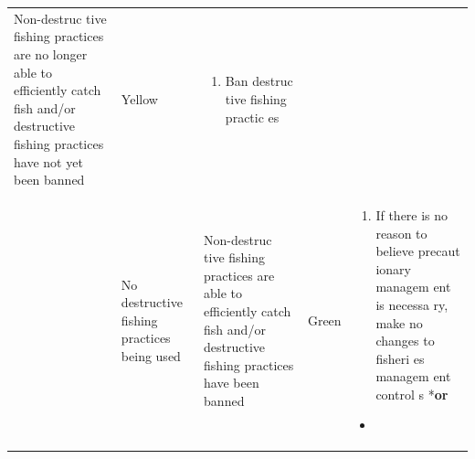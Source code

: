 \documentclass[]{book}
\providecommand{\tightlist}{%
  \setlength{\itemsep}{0pt}\setlength{\parskip}{0pt}}
\begin{document}
\begin{longtable}[]{@{}lllll@{}}
\begin{minipage}[t]{0.19\columnwidth}
Non-destruc tive fishing practices are no longer able to efficiently
catch fish and/or destructive fishing practices have not yet been
banned\strut
\end{minipage} & \begin{minipage}[t]{0.19\columnwidth}\raggedright\strut
Yellow\strut
\end{minipage} & \begin{minipage}[t]{0.19\columnwidth}\raggedright\strut
\begin{enumerate}
\def\labelenumi{\arabic{enumi}.}
\tightlist
\item
  Ban destruc tive fishing practic es
\end{enumerate}\strut
\end{minipage}\tabularnewline
\begin{minipage}[t]{0.19\columnwidth}\raggedright\strut
\strut
\end{minipage} & \begin{minipage}[t]{0.19\columnwidth}\raggedright\strut
No destructive fishing practices being used\strut
\end{minipage} & \begin{minipage}[t]{0.19\columnwidth}\raggedright\strut
Non-destruc tive fishing practices are able to efficiently catch fish
and/or destructive fishing practices have been banned\strut
\end{minipage} & \begin{minipage}[t]{0.19\columnwidth}\raggedright\strut
Green\strut
\end{minipage} & \begin{minipage}[t]{0.19\columnwidth}\raggedright\strut
\begin{enumerate}
\def\labelenumi{\arabic{enumi}.}
\tightlist
\item
  If there is no reason to believe precaut ionary managem ent is necessa
  ry, make no changes to fisheri es managem ent control s *\textbf{or}
\end{enumerate}

\begin{itemize}
\item
\end{itemize}


\end{minipage}
\end{longtable}
\end{document}
